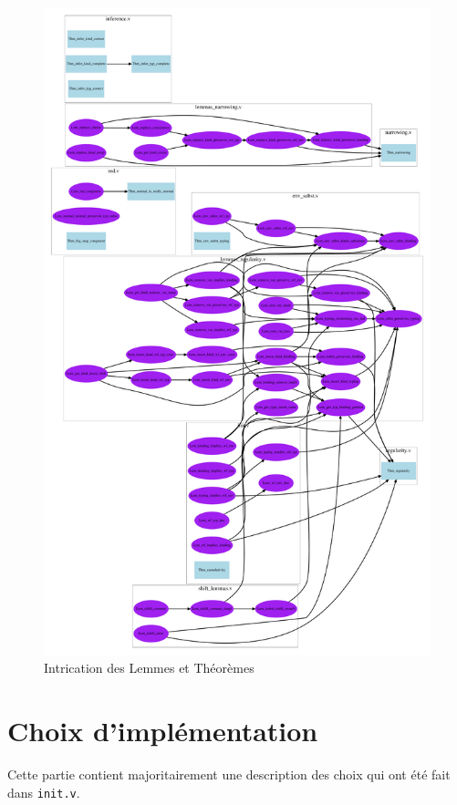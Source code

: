 \documentclass[a4paper,10pt]{scrartcl}
\begin{document}
      \begin{figure}
      
      \noindent\includegraphics[width=0.9\linewidth]{../lol.pdf}
      \caption{Intrication des Lemmes et Théorèmes}
      \label{fig:graph}
      \end{figure}
      
     \section{Choix d'implémentation}
     Cette partie contient majoritairement une description des choix qui ont été fait dans \texttt{init.v}. 
\end{document}
